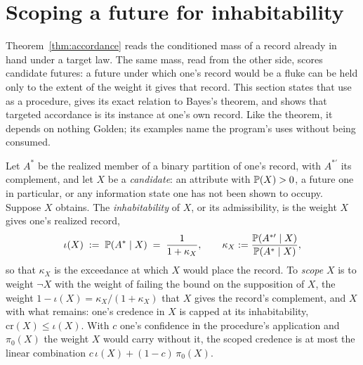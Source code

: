 \section{Scoping a future for inhabitability}\label{sec:scoping}

Theorem~\ref{thm:accordance} reads the conditioned mass of a record
already in hand under a target law. The same mass, read from the other
side, scores candidate futures: a future under which one's record would
be a fluke can be held only to the extent of the weight it gives that
record. This section states that use as a procedure, gives its exact
relation to Bayes's theorem, and shows that targeted accordance is its
instance at one's own record. Like the theorem, it depends on nothing
Golden; its examples name the program's uses without being consumed.

\begin{definition}[Inhabitability, and scoping; a
procedure]\label{def:scoping}
Let $A^\ast$ be the realized member of a binary partition of one's
record, with $A^{\ast\prime}$ its complement, and let $X$ be a
\emph{candidate}: an attribute with $\mathbb{P}(X)>0$, a future one in
particular, or any information state one has not been shown to occupy.
Suppose $X$ obtains. The \emph{inhabitability} of $X$, or its
admissibility, is the weight $X$ gives one's realized record,
\begin{equation}\label{eq:inhab}
\iota(X)\;:=\;\mathbb{P}(A^\ast\mid X)\;=\;\frac{1}{1+\kappa_X},\qquad
\kappa_X:=\frac{\mathbb{P}(A^{\ast\prime}\mid X)}{\mathbb{P}(A^\ast\mid X)},
\end{equation}
so that $\kappa_X$ is the exceedance at which $X$ would place the
record. To \emph{scope} $X$ is to weight $\neg X$ with the weight of
failing the bound on the supposition of $X$, the weight
$1-\iota(X)=\kappa_X/(1+\kappa_X)$ that $X$ gives the record's
complement, and $X$ with what remains: one's credence in $X$ is capped
at its inhabitability, $\mathrm{cr}(X)\le\iota(X)$. With $c$ one's
confidence in the procedure's application and $\pi_0(X)$ the weight $X$
would carry without it, the scoped credence is at most the linear
combination $c\,\iota(X)+(1-c)\,\pi_0(X)$.
\end{definition}

